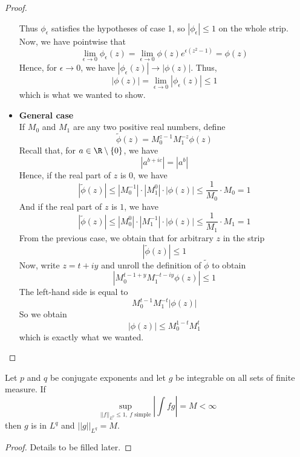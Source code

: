 \begin{proof}
\begin{itemize}
{        Thus $\phi_{\epsilon}$ satisfies the hypotheses of case 1, so $|\phi_{\epsilon}| \leq 1$ on the whole strip.\\
        Now, we have pointwise that
        \[\lim_{\epsilon \to 0} \phi_{\epsilon}(z) = \lim_{\epsilon \to 0} \phi(z) e^{\epsilon(z^2-1)} = \phi(z)\]
        Hence, for $\epsilon \to 0$, we have $|\phi_{\epsilon}(z)| \to |\phi(z)|$.
        Thus,
        \[ |\phi(z)| = \lim_{\epsilon \to 0} |\phi_{\epsilon}(z)| \leq 1 \]
        which is what we wanted to show.
        }
        \item{ \textbf{General case}\\
        If $M_0$ and $M_1$ are any two positive real numbers, define
        \[ \tilde{\phi} (z) = M_0 ^{z-1} M_1^{-z} \phi(z) \]
        Recall that, for $a\in \R\setminus\{0\}$, we have
        \[ |a^{b+ic}| = |a^b| \]
        Hence, if the real part of $z$ is $0$, we have
        \[ |\tilde{\phi} (z)| \leq |M_0^{-1}| \cdot |M_1^0| \cdot |\phi(z)| \leq \frac{1}{M_0} \cdot M_0 = 1 \]
        And if the real part of $z$ is $1$, we have
        \[ |\tilde{\phi} (z)| \leq |M_0^0| \cdot |M_1^{-1}| \cdot |\phi(z)| \leq \frac{1}{M_1} \cdot M_1 = 1 \]
        From the previous case, we obtain that for arbitrary $z$ in the strip
        \[ |\tilde{\phi} (z)| \leq 1 \]
        Now, write $z= t + iy$ and unroll the definition of $\tilde{\phi}$ to obtain
        \[ |M_0^{t-1+y} M_1^{-t-iy} \phi(z)| \leq 1 \]
        The left-hand side is equal to
        \[ M_0^{t-1} M_1^{-t} |\phi(z)| \]
        So we obtain
        \[|\phi(z)| \leq M_0^{1-t} M_1^t\]
        which is exactly what we wanted.
        }
    \end{itemize}
\end{proof}


\begin{lemma}
  \label{lem:lp_of_sup_norm}
  Let $p$ and $q$ be conjugate exponents and let $g$ be integrable on all sets of finite measure. If
  \[ \sup_{||f||_{L^p} \leq 1, \ f \text{ simple}} \left| \int fg \right| = M < \infty \]
  then $g$ is in $L^q$ and $||g||_{L^q} = M$.
  \end{lemma}
\begin{proof}
  Details to be filled later.
\end{proof}

